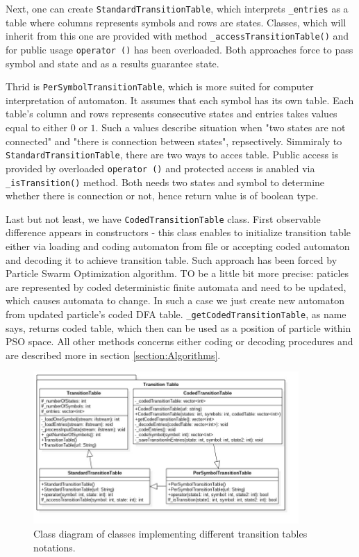 \documentclass{article}
\begin{document}
Next, one can create \texttt{StandardTransitionTable}, which interprets \texttt{\_entries} as a table where columns represents symbols and rows are states. Classes, which will inherit from this one are provided with method \texttt{\_accessTransitionTable()} and for public usage \texttt{operator ()} has been overloaded. Both approaches force to pass symbol and state and as a results guarantee state. 

Thrid  is \texttt{PerSymbolTransitionTable}, which is more suited for computer interpretation of automaton. It assumes that each symbol has its own table. Each table's column and rows represents consecutive states and entries takes values equal to either $0$ or $1$. Such a values describe situation when "two states are not connected" and "there is connection between states", repsectively. Simmiraly to \texttt{StandardTransitionTable}, there are two ways to acces table. Public access is provided by overloaded \texttt{operator ()} and protected access is anabled via \texttt{\_isTransition()} method. Both needs two states and symbol to determine whether there is connection or not, hence return value is of boolean type.

Last but not least, we have \texttt{CodedTransitionTable} class. First observable difference appears in constructors - this class enables to initialize transition table either via loading and coding automaton from file or accepting coded automaton and decoding it to achieve transition table. Such approach has been forced by Particle Swarm Optimization algorithm. TO be a little bit more precise: paticles are represented by coded deterministic finite automata and need to be updated, which causes automata to change. In such a case we just create new automaton from updated particle's coded DFA table. \texttt{\_getCodedTransitionTable}, as name says, returns coded table, which then can be used as a position of particle within PSO space. All other methods concerns either coding or decoding procedures and are described more in section \ref{section:Algorithms}.




\begin{figure}[H]
	\centering
	\includegraphics[width=0.9\textwidth]{images/transition_table.jpg}
    \caption{Class diagram of classes implementing different transition tables notations.}
    \label{fig:trans_table_class}
\end{figure}
\end{document}
